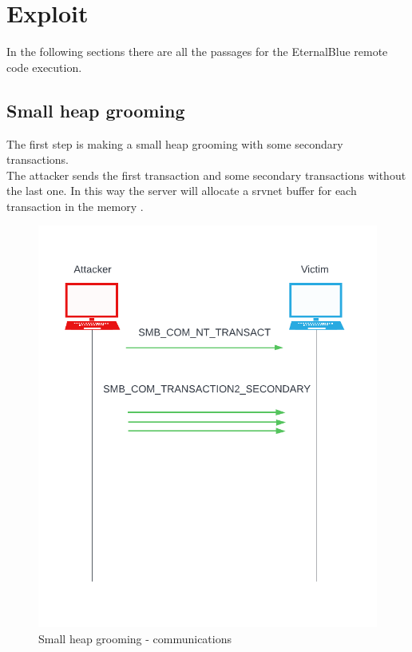 \section{Exploit}
In the following sections there are all the passages\cite{eternalblue-checkpoint} for the EternalBlue remote code execution.

\subsection{Small heap grooming}
The first step is making a small heap grooming with some secondary transactions.\\
The attacker sends the first transaction and some secondary transactions without the last one. In this way the server will allocate 
a srvnet buffer for each transaction in the memory\cite{eternalblue-checkpoint} .
\begin{figure}[ht!]
    \centering
      \includegraphics[scale=0.5]{images/exploit_1_comm.png}
      \caption{Small heap grooming - communications}
\end{figure}

